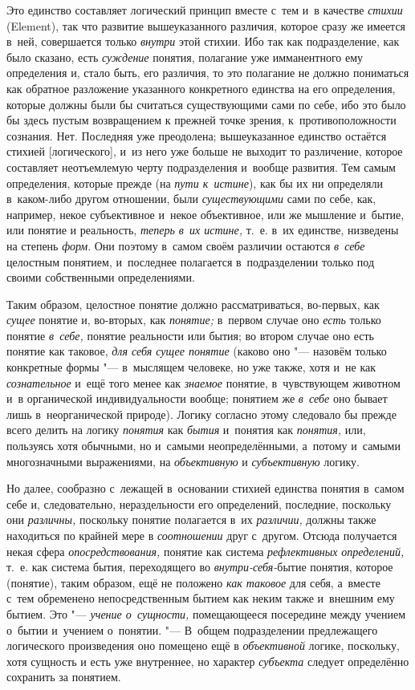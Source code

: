 Это единство составляет логический принцип вместе с~тем и~в качестве
{\em стихии} (Ele\-ment), так что развитие вышеуказанного
различия, которое сразу же имеется в~ней, совершается только
{\em внутри} этой стихии. Ибо так как подразделение,
как было сказано, есть {\em суждение} понятия,
полагание уже имманентного ему определения и, стало быть, его различия, то
это полагание не должно пониматься как обратное разложение указанного
конкретного единства на его определения, которые должны были бы считаться
существующими сами по себе, ибо это было бы здесь пустым возвращением к
прежней точке зрения, к~противоположности сознания. Нет. Последняя уже
преодолена; вышеуказанное единство остаётся стихией [логического], и~из
него уже больше не выходит то различение, которое составляет неотъемлемую
черту подразделения и~вообще развития. Тем самым определения, которые
прежде (на {\em пути к~истине}), как бы их ни
определяли в~каком-либо другом отношении, были
{\em существующими} сами по себе, как, например, некое
субъективное и~некое объективное, или же мышление и~бытие, или понятие и
реальность, {\em теперь в~их истине,} т.~е. в~их
единстве, низведены на степень {\em форм}. Они поэтому
в~самом своём различии остаются {\em в~себе} целостным
понятием, и~последнее полагается в~подразделении только под своими
собственными определениями.

Таким образом, целостное понятие должно рассматриваться, во-первых, как
{\em сущее} понятие и, во-вторых, как {\em понятие;} в~первом случае оно
{\em есть} только понятие {\em в~себе,} понятие реальности или бытия;
во втором случае оно есть понятие как таковое, {\em для себя сущее понятие}
(каково оно "--- назовём только конкретные формы "--- в~мыслящем человеке,
но уже также, хотя и~не как {\em сознательное} и~ещё того менее как
{\em знаемое} понятие, в~чувствующем животном и~в
органической индивидуальности вообще; понятием же
{\em в~себе} оно бывает лишь в~неорганической природе).
Логику согласно этому следовало бы прежде всего делить на логику
{\em понятия} как {\em бытия} и~понятия как {\em понятия,} или, пользуясь
хотя обычными, но и~самыми неопределёнными, а~потому и~самыми многозначными
выражениями, на {\em объективную} и {\em субъективную} логику.

Но далее, сообразно с~лежащей в~основании стихией единства понятия в~самом
себе и, следовательно, нераздельности его определений, последние, поскольку
они {\em различны,} поскольку понятие полагается в~их
{\em различии,} должны также находиться по крайней мере
в {\em соотношении} друг с~другом. Отсюда получается
некая сфера {\em опосредствования,} понятие как система
{\em рефлективных определений,} т.~е. как система
бытия, переходящего во {\em внутри-себя-}бытие понятия,
которое (понятие), таким образом, ещё не положено
{\em как таковое} для себя, а~вместе с~тем обременено
непосредственным бытием как неким также и~внешним ему бытием. Это
"--- {\em учение о~сущности,} помещающееся посередине
между учением о~бытии и~учением о~понятии. "--- В~общем подразделении
предлежащего логического произведения оно помещено ещё в
{\em объективной} логике, поскольку, хотя сущность и
есть уже внутреннее, но характер {\em субъекта} следует
определённо сохранить за понятием.

